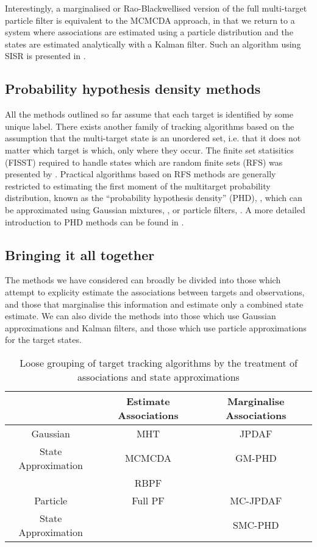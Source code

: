 Interestingly, a marginalised or Rao-Blackwellised version of the full multi-target particle filter is equivalent to the MCMCDA approach, in that we return to a system where associations are estimated using a particle distribution and the states are estimated analytically with a Kalman filter. Such an algorithm using SISR is presented in \cite{Sarkka2007}.




\subsection{Probability hypothesis density methods}
All the methods outlined so far assume that each target is identified by some unique label. There exists another family of tracking algorithms based on the assumption that the multi-target state is an unordered set, i.e. that it does not matter which target is which, only where they occur. The finite set statisitics (FISST) required to handle states which are random finite sets (RFS) was presented by \cite{Mahler1994}. Practical algorithms based on RFS methods are generally restricted to estimating the first moment of the multitarget probability distribution, known as the ``probability hypothesis density'' (PHD), \cite{Mahler2003}, which can be approximated using Gaussian mixtures, \cite{Vo2006}, or particle filters, \cite{Vo2005,Whiteley2010}. A more detailed introduction to PHD methods can be found in \cite{Mahler2004,Wood2010}.



\subsection{Bringing it all together}
The methods we have considered can broadly be divided into those which attempt to explicity estimate the associations between targets and observations, and those that marginalise this information and estimate only a combined state estimate. We can also divide the methods into those which use Gaussian approximations and Kalman filters, and those which use particle approximations for the target states.

\begin{table}[!hbt]%
\begin{center}\begin{tabular}{|c|c|c|}
\hline
 & Estimate Associations & Marginalise Associations\\
\hline
Gaussian & MHT & JPDAF \\
State Approximation & MCMCDA & GM-PHD \\ 
 & RBPF & \\
\hline
Particle & Full PF & MC-JPDAF \\
State Approximation & & SMC-PHD \\
\hline
\end{tabular}\end{center}
\caption{Loose grouping of target tracking algorithms by the treatment of associations and state approximations}
\label{}
\end{table}

